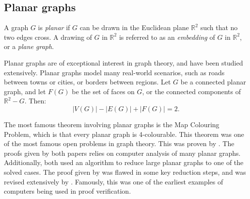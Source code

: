\subsection{Planar graphs}
A graph \(G\) is \textit{planar} if \(G\) can be drawn in the Euclidean plane \( \mathbb{R}^2 \) such that no two edges cross. A drawing of $G$ in $\mathbb{R}^2$ is referred to as an \textit{embedding} of $G$ in $\mathbb{R}^2$, or a \textit{plane graph}. 

Planar graphs are of exceptional interest in graph theory, and have been studied extensively. Planar graphs model many real-world scenarios, such as roads between towns or cities, or borders between regions.
Let $G$ be a connected planar graph, and let $F(G)$ be the set of faces on $G$, or the connected components of $\mathbb{R}^2 - G$. Then:
\begin{equation}
	|V(G)| - |E(G)| + |F(G)| = 2. 
\end{equation}

The most famous theorem involving planar graphs is the Map Colouring Problem,  which is that every planar graph is 4-colourable. 
This theorem was one of the most famous open problems in graph theory.
This was proven by \textcite{appelEveryPlanarMap1989,robertsonEfficientlyFourcoloringPlanar1996}. The proofs given by both papers relies on computer analysis of many planar graphs. Additionally, both used an algorithm to reduce large planar graphs to one of the solved cases. The proof given by \textcite{appelEveryPlanarMap1989} was flawed in some key reduction steps, and was revised extensively by \textcite{robertsonEfficientlyFourcoloringPlanar1996}. Famously, this was one of the earliest examples of computers being used in proof verification.

